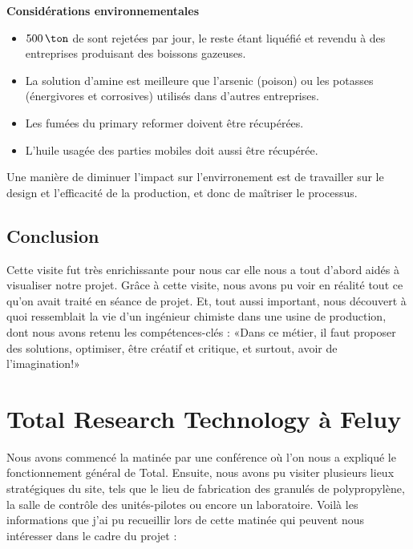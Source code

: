 \textbf{Considérations environnementales}
\begin{itemize}
\item $500\,\ton$ de  sont rejetées par jour, le reste étant liquéfié et revendu à des entreprises produisant des boissons gazeuses.
\item La solution d'amine est meilleure que l'arsenic (poison) ou les potasses (énergivores et corrosives) utilisés dans d'autres entreprises.
\item Les fumées du primary reformer doivent être récupérées.
\item L'huile usagée des parties mobiles doit aussi être récupérée.
\end{itemize}
Une manière de diminuer l'impact sur l'envirronement est de
travailler sur le design et l'efficacité de la production,
et donc de maîtriser le processus.

\subsection{Conclusion}

Cette visite fut très enrichissante pour nous car elle nous a tout d'abord aidés à visualiser notre projet. Grâce à cette visite, nous avons pu voir en réalité tout ce qu'on avait traité en séance de projet.
Et, tout aussi important, nous découvert à quoi ressemblait la vie d'un ingénieur chimiste dans une usine de production, dont nous avons retenu les compétences-clés : «Dans ce métier, il faut proposer des solutions, optimiser, être créatif et critique, et surtout, avoir de l'imagination!» 

\section{Total Research Technology à Feluy}
Nous avons commencé la matinée par une conférence où l'on nous a expliqué le fonctionnement général de Total. Ensuite, nous avons pu visiter plusieurs lieux stratégiques du site, tels que le lieu de fabrication des granulés de polypropylène, la salle de contrôle des unités-pilotes ou encore un laboratoire.
Voilà les informations que j'ai pu recueillir lors de cette matinée qui peuvent nous intéresser dans le cadre du projet :

